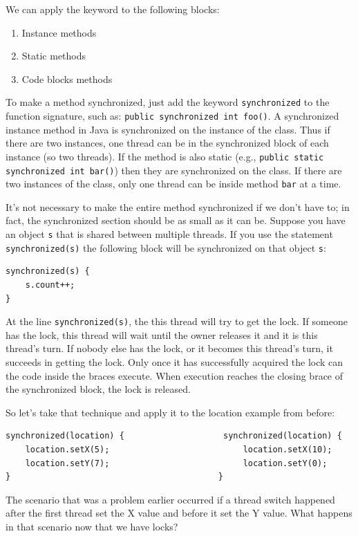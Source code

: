We can apply the keyword to the following blocks:
\begin{enumerate}
	\item Instance methods
	\item Static methods
	\item Code blocks methods
\end{enumerate}

To make a method synchronized, just add the keyword \texttt{synchronized} to the function signature, such as: \texttt{public synchronized int foo()}. A synchronized instance method in Java is synchronized on the instance of the class. Thus if there are two instances, one thread can be in the synchronized block of each instance (so two threads). If the method is also static (e.g., \texttt{public static synchronized int bar()}) then they are synchronized on the class. If there are two instances of the class, only one thread can be inside method \texttt{bar} at a time. 

It's not necessary to make the entire method synchronized if we don't have to; in fact, the synchronized section should be as small as it can be. Suppose you have an object \texttt{s} that is shared between multiple threads. If you use the statement \texttt{synchronized(s)} the following block will be synchronized on that object \texttt{s}:
\begin{verbatim}
synchronized(s) {
    s.count++;
}
\end{verbatim}

At the line \texttt{synchronized(s)}, the this thread will try to get the lock. If someone has the lock, this thread will wait until the owner releases it and it is this thread's turn. If nobody else has the lock, or it becomes this thread's turn, it succeeds in getting the lock. Only once it has successfully acquired the lock can the code inside the braces execute. When execution reaches the closing brace of the synchronized block, the lock is released.

So let's take that technique and apply it to the location example from before:

\begin{verbatim}
synchronized(location) {                    synchronized(location) {
    location.setX(5);                           location.setX(10);
    location.setY(7);                           location.setY(0);
}                                          }
\end{verbatim}

The scenario that was a problem earlier occurred if a thread switch happened after the first thread set the X value and before it set the Y value. What happens in that scenario now that we have locks?

